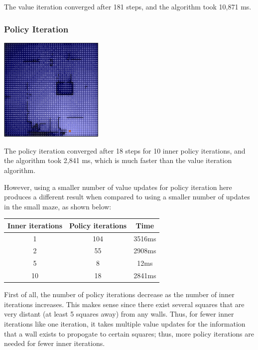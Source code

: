 \documentclass[11pt]{article}
\begin{document}
            The value iteration converged after 181 steps, and the algorithm
            took 10,871 ms.

            \subsubsection{Policy Iteration}

            \includegraphics[width=5cm]{../images/large/pi.PNG}

            The policy iteration converged after 18 steps for 10 inner
            policy iterations, and the algorithm
            took 2,841 ms, which is much faster than the value iteration algorithm.

            However, using a smaller number of value updates for policy iteration here produces
            a different result when compared to using a smaller number of updates in the
            small maze, as shown below:

            \begin{tabular}{c c c}
                Inner iterations & Policy iterations & Time \\ \hline
                1 & 104 & 3516ms \\ \hline
                2 & 55 & 2908ms \\ \hline
                5 & 8 & 12ms \\ \hline
                10 & 18 & 2841ms \\ \hline

            \end{tabular}

            First of all, the number of policy iterations decrease as the number of inner iterations
            increases. This makes sense since there exist several squares that are very distant
            (at least 5 squares away) from any walls. Thus, for fewer inner iterations like one iteration,
            it takes multiple value updates for the information that a wall exists to propogate to certain
            squares; thus, more policy iterations are needed for fewer inner iterations.
\end{document}

